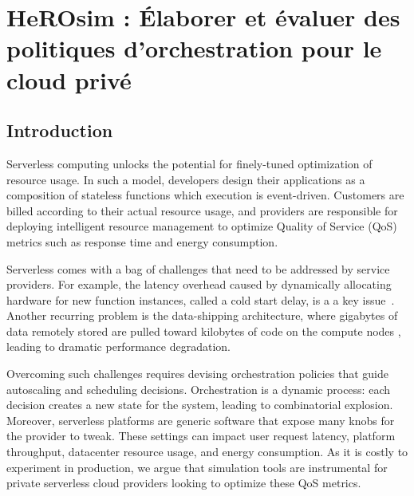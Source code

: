 \chapter{HeROsim : Élaborer et évaluer des politiques d'orchestration pour le cloud privé}

\section{Introduction}
\label{section:herosim-introduction}

Serverless computing unlocks the potential for finely-tuned optimization of resource usage. In such a model, developers design their applications as a composition of stateless functions which execution is event-driven. %
Customers are billed according to their actual resource usage, and providers are responsible for deploying intelligent resource management to optimize Quality of Service (QoS) metrics such as response time and energy consumption.%




Serverless comes with a bag of challenges that need to be addressed by service providers. For example, the latency overhead caused by dynamically allocating hardware for new function instances, called a cold start delay, is a a key issue~\cite{Lannurien2023}. Another recurring problem is the data-shipping architecture, where gigabytes of data remotely stored are pulled toward kilobytes of code on the compute nodes%
, leading to dramatic performance degradation.

Overcoming such challenges requires devising orchestration policies that guide autoscaling and scheduling decisions.
Orchestration is a dynamic process: each decision creates a new state for the system, leading to combinatorial explosion. Moreover, serverless platforms are generic software that expose many knobs for the provider to tweak. These settings can impact user request latency, platform throughput, datacenter resource usage, and energy consumption. As it is costly to experiment in production, we argue that simulation tools are instrumental for private serverless cloud providers looking to optimize these QoS metrics.%


